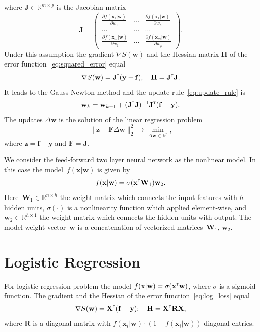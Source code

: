 \documentclass[a4paper,12pt]{article}
\theoremstyle{plain} %
\theoremstyle{definition} %
\theoremstyle{remark} %
\newcommand{\bw}{\mathbf{w}}
\newcommand{\by}{\mathbf{y}}
\newcommand{\bx}{\mathbf{x}}
\newcommand{\bz}{\mathbf{z}}
\newcommand{\bJ}{\mathbf{J}}
\newcommand{\bbR}{\mathbb{R}}
\newcommand{\bW}{\mathbf{W}}
\newcommand{\bH}{\mathbf{H}}
\newcommand{\bF}{\mathbf{F}}
\newcommand{\bR}{\mathbf{R}}
\newcommand{\bX}{\mathbf{X}}
\newcommand{\T}{{\text{\tiny\sffamily\upshape\mdseries T}}}
\begin{document}
	where $\mathbf{J} \in \bbR^{m \times p}$ is the Jacobian matrix
	\begin{equation}
		\bJ = 
		\begin{pmatrix}
		\frac{\partial f(\bx_1 | \bw)}{\partial w_1} & \dots & 
		\frac{\partial f(\bx_1 | \bw)}{\partial w_p} \\
		\dots & \dots & \dots \\
		\frac{\partial f(\bx_m | \bw)}{\partial w_1} & \dots & 
		\frac{\partial f(\bx_m | \bw)}{\partial w_p}
		\end{pmatrix}.
	\end{equation}
	Under this assumption the gradient $\nabla S(\bw)$ and the Hessian matrix $\bH$ of the error function~\eqref{eq:squared_error} equal
	\begin{equation}
		\nabla S(\bw) = \bJ^{\T} (\by - \mathbf{f}); \quad \bH = \bJ^{\T} \bJ.
		\label{eq:nonlin_reg_deriv}
	\end{equation}
	It leads to the Gauss-Newton method and the update rule~\eqref{eq:update_rule} is 
	\[
		\bw_k = \bw_{k - 1} + (\bJ^{\T} \bJ)^{-1}\bJ^{\T}(\mathbf{f} - \by).
	\]
	The updates $\Delta \bw$ is the solution of the linear regression problem
	\begin{equation}
		\| \bz - \bF \Delta \bw \|_2^2 \rightarrow \min_{\Delta \bw \in \bbR^{p}},
		\label{eq:lin_reg_nonlin_reg}
	\end{equation}
	where $\bz = \mathbf{f} - \by$ and $\bF = \bJ$.
	
	We consider the feed-forward two layer neural network as the nonlinear model. In this case the model~$f(\bx | \bw)$ is given by
	\[
	f(\bx | \bw) = \sigma(\bx^{\T} \bW_1) \bw_2.
	\]
	Here~$\bW_1 \in \bbR^{n \times h}$ the weight matrix which connects the input features with $h$ hidden units, $\sigma(\cdot)$ is a nonlinearity function which applied element-wise, and $\bw_2 \in \bbR^{h \times 1}$ the weight matrix which connects the hidden units with output. 
	The model weight vector~$\bw$ is a concatenation of vectorized matrices~$\bW_1$, $\bw_2$.
	
	\section*{Logistic Regression}
	For logistic regression problem the model $f(\bx | \bw) = \sigma(\bx^{\T} \bw)$, where $\sigma$ is a sigmoid function.
	The gradient and the Hessian of the error function~\eqref{eq:log_loss} equal
	\begin{equation}
		\nabla S(\bw) = \bX^{\T} (\mathbf{f} - \by); \quad \bH = \bX^{\T} \bR \bX,
		\label{eq:log_reg_deriv}
	\end{equation}
	where $\bR$ is a diagonal matrix with $f(\bx_i | \bw) \cdot (1 - f(\bx_i | \bw))$ diagonal entries.
	
\end{document}
